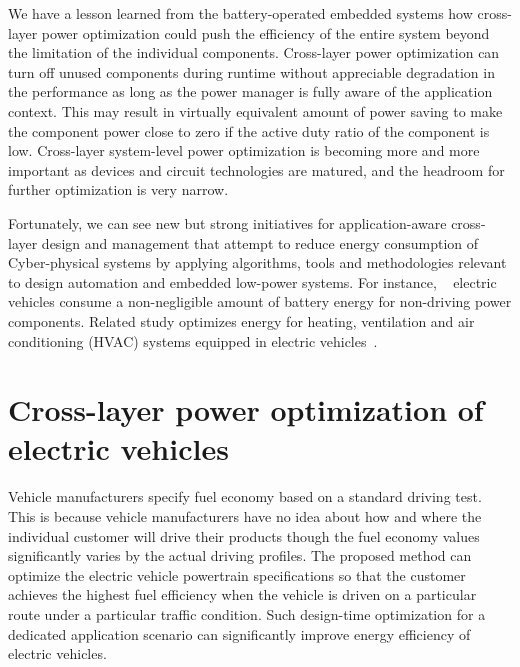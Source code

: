 \documentclass[journal]{IEEEtran}
\begin{document}
We have a lesson learned from the battery-operated embedded systems how cross-layer power optimization could push the efficiency of the entire system beyond the limitation of the individual components. Cross-layer power optimization can turn off unused components during runtime without appreciable degradation in the performance as long as the power manager is fully aware of the application context. This may result in virtually equivalent amount of power saving to make the component power close to zero if the active duty ratio of the component is low. Cross-layer system-level power optimization is becoming more and more important as devices and circuit technologies are matured, and the headroom for further optimization is very narrow. 

Fortunately, we can see new but strong initiatives for application-aware cross-layer design and management that attempt to reduce energy consumption of Cyber-physical systems by applying algorithms, tools and methodologies relevant to design automation and embedded low-power systems. 
For instance,
~\cite{Lin:ICCAD14}
electric vehicles consume a non-negligible amount of battery energy for non-driving power components. Related study optimizes energy for heating, ventilation and air conditioning (HVAC) systems equipped in electric vehicles~\cite{Vatanparvar:DAC15}. %


\section{Cross-layer power optimization of electric vehicles}

Vehicle manufacturers specify fuel economy based on a standard driving test. This is because vehicle manufacturers have no idea about how and where the individual customer will drive their products though the fuel economy values significantly varies by the actual driving profiles. 
The proposed method can optimize the electric vehicle powertrain specifications so that the customer achieves the highest fuel efficiency when the vehicle is driven on a particular route under a particular traffic condition. 
Such design-time optimization for a dedicated application scenario can significantly improve energy efficiency of electric vehicles.
\end{document}
